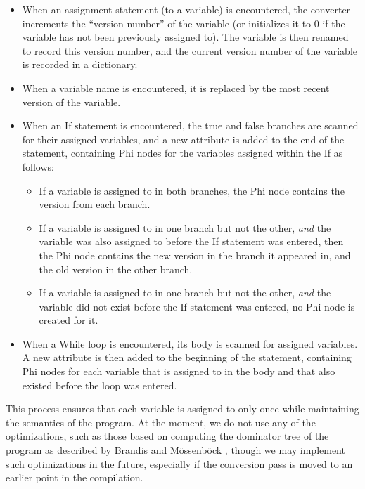 \documentclass[11pt,twocolumn]{article}
\begin{document}
\begin{itemize}
\item When an assignment statement (to a variable) is encountered, the
  converter increments the ``version number'' of the variable (or
  initializes it to $0$ if the variable has not been previously
  assigned to). The variable is then renamed to record this version
  number, and the current version number of the variable is recorded
  in a dictionary.
\item When a variable name is encountered, it is replaced by the most
  recent version of the variable.
\item When an If statement is encountered, the true and false branches
  are scanned for their assigned variables, and a new attribute is
  added to the end of the statement, containing Phi nodes for the
  variables assigned within the If as follows:
  \begin{itemize}
  \item If a variable is assigned to in both branches, the Phi node
    contains the version from each branch.
  \item If a variable is assigned to in one branch but not the other,
    \textit{and} the variable was also assigned to before the If
    statement was entered, then the Phi node contains the new version
    in the branch it appeared in, and the old version in the other
    branch.
  \item If a variable is assigned to in one branch but not the other,
    \textit{and} the variable did not exist before the If
    statement was entered, no Phi node is created for it.
  \end{itemize}
\item When a While loop is encountered, its body is scanned for
  assigned variables. A new attribute is then added to the beginning
  of the statement, containing Phi nodes for each variable that is
  assigned to in the body and that also existed before the loop was
  entered.
\end{itemize}

This process ensures that each variable is assigned to only once while
maintaining the semantics of the program. At the moment, we do not use
any of the optimizations, such as those based on computing the
dominator tree of the program as described by Brandis and
M\"{o}ssenb\"{ock} \cite{brandis-mossenbock}, though we may implement such
optimizations in the future, especially if the conversion pass is
moved to an earlier point in the compilation.
\end{document}
